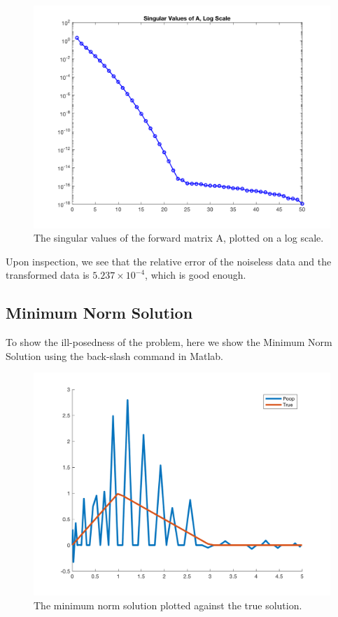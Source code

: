 \documentclass{article}
\begin{document}
\begin{figure}[H]
    \centerline{
    \includegraphics[height = 10 cm]{SingularValues.png}
    }
    \caption{\label{fig:Singular Values} The singular values of the forward matrix A, plotted on a log scale.}
\end{figure}

Upon inspection, we see that the relative error of the noiseless data and the transformed data is $5.237 \times 10^{-4}$, which is good enough. 

\subsection{Minimum Norm Solution}

To show the ill-posedness of the problem, here we show the Minimum Norm Solution using the back-slash command in Matlab.

\begin{figure}[H]
    \centerline{
    \includegraphics[height = 10 cm]{PoopSolution.png}
    }
    \caption{\label{fig:Poop Solution} The minimum norm solution plotted against the true solution.}
\end{figure}
\end{document}
